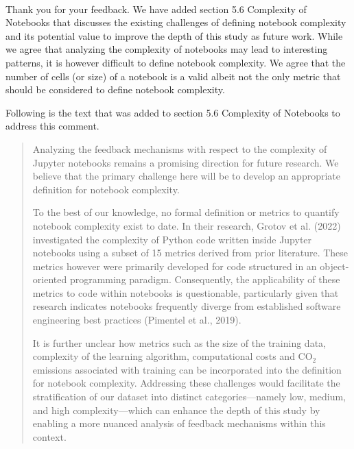 \documentclass[11pt,fleqn]{article}
\newcommand{\eline}{\vspace*{.75\baselineskip}}
\newcommand{\Us}{\eline \noindent {\bf Response:}\\}
\begin{document}
\Us Thank you for your feedback. We have added section 5.6 Complexity of Notebooks that discusses the existing challenges of defining notebook complexity and its potential value to improve the depth of this study as future work. While we agree that analyzing the complexity of notebooks may lead to interesting patterns, it is however difficult to define notebook complexity. We agree that the number of cells (or size) of a notebook is a valid albeit not the only metric that should be considered to define notebook complexity.

Following is the text that was added to section 5.6 Complexity of Notebooks to address this comment.

\begin{quote}
  Analyzing the feedback mechanisms with respect to the complexity of Jupyter notebooks remains a promising direction for future research. We believe that the primary challenge here will be to develop an appropriate definition for notebook complexity.

  To the best of our knowledge, no formal definition or metrics to quantify notebook complexity exist to date. In their research, Grotov et al. (2022) investigated the complexity of Python code written inside Jupyter notebooks using a subset of 15 metrics derived from prior literature. These metrics however were primarily developed for code structured in an object-oriented programming paradigm. Consequently, the applicability of these metrics to code within notebooks is questionable, particularly given that research indicates notebooks frequently diverge from established software engineering best practices (Pimentel et al., 2019).

  It is further unclear how metrics such as the size of the training data, complexity of the learning algorithm, computational costs and CO\(_2\) emissions associated with training can be incorporated into the definition for notebook complexity. Addressing these challenges would facilitate the stratification of our dataset into distinct categories---namely low, medium, and high complexity---which can enhance the depth of this study by enabling a more nuanced analysis of feedback mechanisms within this context.

\end{quote}
\end{document}
